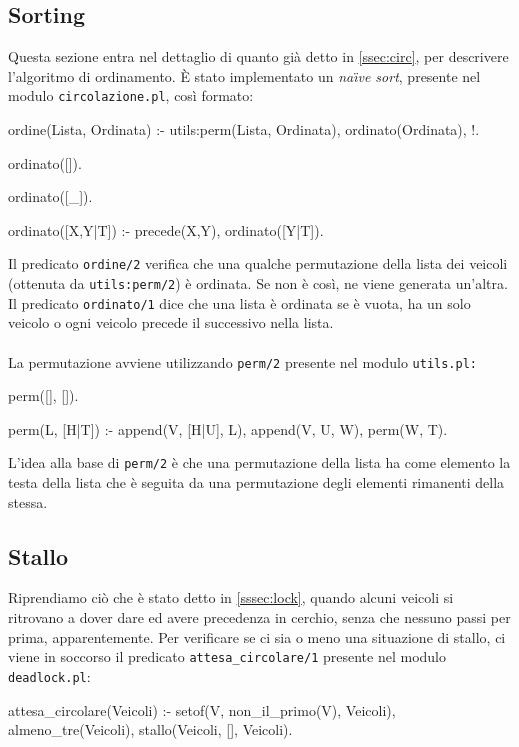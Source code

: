 \subsection{Sorting}
Questa sezione entra nel dettaglio di quanto già detto in \ref{ssec:circ}, per descrivere l'algoritmo di ordinamento. È stato implementato un \emph{na\"{\i}ve sort}\cite{Clocksin:2003}, presente nel modulo \texttt{circolazione.pl}, così formato:
\begin{verbatimtab}
ordine(Lista, Ordinata) :-
	utils:perm(Lista, Ordinata),
	ordinato(Ordinata),
	!.

ordinato([]).

ordinato([_]).

ordinato([X,Y|T]) :-
	precede(X,Y),
	ordinato([Y|T]).
\end{verbatimtab}

Il predicato \texttt{ordine/2} verifica che una qualche permutazione della lista dei veicoli (ottenuta da \texttt{utils:perm/2}) è ordinata. Se non è così, ne viene generata un'altra. Il predicato \texttt{ordinato/1} dice che una lista è ordinata se è vuota, ha un solo veicolo o ogni veicolo precede il successivo nella lista.
\\\\
La permutazione avviene utilizzando \texttt{perm/2} presente nel modulo \texttt{utils.pl:}
\begin{verbatimtab}
perm([], []).
	
perm(L, [H|T]) :-
	append(V, [H|U], L),
	append(V, U, W),
	perm(W, T).
\end{verbatimtab}

L'idea alla base di \texttt{perm/2} è che una permutazione della lista ha come elemento la testa della lista che è seguita da una permutazione degli elementi rimanenti della stessa.

\subsection{Stallo}
Riprendiamo ciò che è stato detto in \ref{sssec:lock}, quando alcuni veicoli si ritrovano a dover dare ed avere precedenza in cerchio, senza che nessuno passi per prima, apparentemente. Per verificare se ci sia o meno una situazione di stallo, ci viene in soccorso il predicato \texttt{attesa\_circolare/1} presente nel modulo \texttt{deadlock.pl}:

\begin{verbatimtab}
attesa_circolare(Veicoli) :-
	setof(V, non_il_primo(V), Veicoli),
	almeno_tre(Veicoli),
	stallo(Veicoli, [], Veicoli).
\end{verbatimtab}

